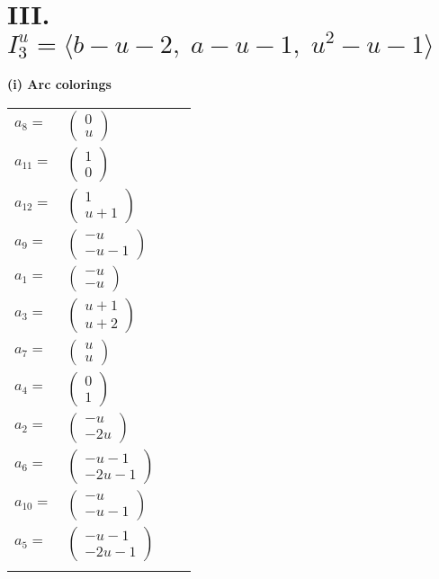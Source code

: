 \documentclass[1p]{elsarticle_modified}
\theoremstyle{definition}
\begin{document}
\centering \section*{III. $I^u_{3}= \langle b- u-2,\;a- u-1,\;u^2- u-1 \rangle$}
\flushleft \textbf{(i) Arc colorings}\\
\begin{tabular}{m{7pt} m{180pt} m{7pt} m{180pt} }
\flushright $a_{8}=$&$\begin{pmatrix}0\\u\end{pmatrix}$ \\
\flushright $a_{11}=$&$\begin{pmatrix}1\\0\end{pmatrix}$ \\
\flushright $a_{12}=$&$\begin{pmatrix}1\\u+1\end{pmatrix}$ \\
\flushright $a_{9}=$&$\begin{pmatrix}- u\\- u-1\end{pmatrix}$ \\
\flushright $a_{1}=$&$\begin{pmatrix}- u\\- u\end{pmatrix}$ \\
\flushright $a_{3}=$&$\begin{pmatrix}u+1\\u+2\end{pmatrix}$ \\
\flushright $a_{7}=$&$\begin{pmatrix}u\\u\end{pmatrix}$ \\
\flushright $a_{4}=$&$\begin{pmatrix}0\\1\end{pmatrix}$ \\
\flushright $a_{2}=$&$\begin{pmatrix}- u\\-2 u\end{pmatrix}$ \\
\flushright $a_{6}=$&$\begin{pmatrix}- u-1\\-2 u-1\end{pmatrix}$ \\
\flushright $a_{10}=$&$\begin{pmatrix}- u\\- u-1\end{pmatrix}$ \\
\flushright $a_{5}=$&$\begin{pmatrix}- u-1\\-2 u-1\end{pmatrix}$\\&\end{tabular}
\end{document}
